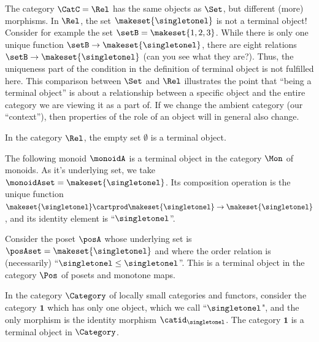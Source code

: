 \begin{remark}
    The category $\CatC = \Rel$ has the same objects as $\Set$, but different (more) morphisms.
    In $\Rel$, the set $\makeset{ \singletonel}$ is not a terminal object! Consider for example the set $\setB = \makeset{1,2,3}$.
    While there is only one unique function $\setB \to \makeset{ \singletonel}$, there are eight relations $\setB \to \makeset{ \singletonel}$ (can you see what they are?).
    Thus, the uniqueness part of the condition in the definition of terminal object is not fulfilled here.
    This comparison between $\Set$ and $\Rel$ illustrates the point that ``being a terminal object'' is about a relationship between a specific object and the entire category we are viewing it as a part of.
    If we change the ambient category (our ``context''), then properties of the role of an object will in general also change.
\end{remark}

\begin{example}\label{exa:term-obj-Rel}
    In the category $\Rel$, the empty set $\emptyset$ is a terminal object.
\end{example}

\begin{example}\label{exa:term-obj-Mon}
    The following monoid $\monoidA$ is a terminal object in the category $\Mon$ of monoids.
    As it's underlying set, we take $\monoidAset = \makeset{ \singletonel}$.
    Its composition operation is the unique function $\makeset{ \singletonel} \cartprod \makeset{ \singletonel} \to \makeset{ \singletonel}$, and its identity element is ``$\singletonel$''.
\end{example}

\begin{example}\label{exa:term-obj-Pos}
    Consider the poset $\posA$ whose underlying set is $\posAset = \makeset{ \singletonel}$ and where the order relation is (necessarily) ``$\singletonel \leq \singletonel$''.
    This is a terminal object in the category $\Pos$ of posets and monotone maps.
\end{example}


\begin{example}\label{exa:term-obj-Cat}
    In the category $\Category$ of locally small categories and functors, consider the category $\mathbf{1}$ which has only one object, which we call ``$\singletonel$", and the only morphism is the identity morphism $\catid_\singletonel$.
    The category $\mathbf{1}$ is a terminal object in $\Category$.
\end{example}

